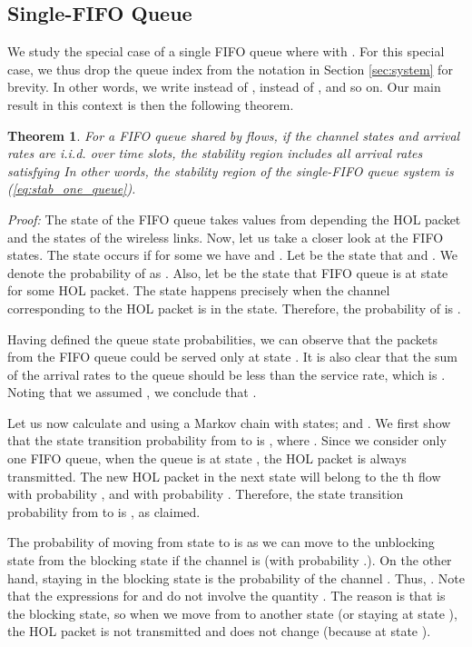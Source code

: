 \documentclass[conference]{IEEEtran}
\newtheorem{theorem}{Theorem}
\begin{document}
\subsection{Single-FIFO Queue} \label{sec:stability_single_queue}
We study the special case of a single FIFO queue  where  with . For this special case, we thus drop the queue index  from the notation in Section \ref{sec:system} for brevity. In other words, we write  instead of ,  instead of , and so on. Our main result in this context is then the following theorem.
\begin{theorem}\label{theorem1}
For a FIFO queue  shared by      flows, if the channel states  and arrival rates  are i.i.d. over time slots, the stability region  includes all arrival rates satisfying
 In other words, the stability region of the single-FIFO queue system is  (\ref{eq:stab_one_queue}).
\end{theorem}
{\em Proof:} The state of the FIFO queue  takes values from  depending the HOL packet and the states of the wireless links. Now, let us take a closer look at the FIFO states. The  state occurs if for some  we have  and . Let  be the state that  and . We denote the probability of  as . Also, let  be the state that FIFO queue is at  state for some HOL packet. The state  happens precisely when the channel corresponding to the HOL packet is in the  state. Therefore, the probability of  is .


Having defined the queue state probabilities, we can observe that the packets from the FIFO queue could be served only at state . It is also clear that the sum of the arrival rates to the queue  should be less than the service rate, which is . Noting that we assumed , we conclude that .

Let us now calculate  and  using a Markov chain with states;  and . We first show that the state transition probability from  to  is , where . Since we consider only one FIFO queue, when the queue is at state , the HOL packet is always transmitted. The new HOL packet in the next state will belong to the th flow with probability , and  with probability . Therefore, the state transition probability from  to  is , as claimed.

The probability of moving from state  to  is  as we can move to the unblocking state  from the blocking state  if the channel is  (with probability .). On the other hand, staying in the blocking state  is the  probability of the channel . Thus, . Note that the expressions for  and  do not involve the quantity . The reason is that  is the blocking state, so when we move from  to another state (or staying at state ), the HOL packet is not transmitted and does not change (because  at state ).
\end{document}
